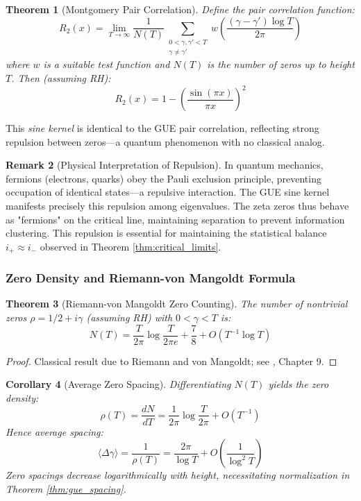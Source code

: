\documentclass[12pt]{article}
\theoremstyle{plain}
\newtheorem{theorem}{Theorem}[section]
\newtheorem{corollary}[theorem]{Corollary}
\theoremstyle{definition}
\newtheorem{remark}[theorem]{Remark}
\begin{document}
\begin{theorem}[Montgomery Pair Correlation]\label{thm:montgomery_correlation}
Define the pair correlation function:
$$R_2(x) = \lim_{T \to \infty} \frac{1}{N(T)} \sum_{\substack{0 < \gamma, \gamma' < T \\ \gamma \neq \gamma'}} w\left(\frac{(\gamma - \gamma') \log T}{2\pi}\right)$$
where $w$ is a suitable test function and $N(T)$ is the number of zeros up to height $T$. Then (assuming RH):
$$R_2(x) = 1 - \left(\frac{\sin(\pi x)}{\pi x}\right)^2$$
\end{theorem}

This \emph{sine kernel} is identical to the GUE pair correlation, reflecting strong repulsion between zeros—a quantum phenomenon with no classical analog.

\begin{remark}[Physical Interpretation of Repulsion]
In quantum mechanics, fermions (electrons, quarks) obey the Pauli exclusion principle, preventing occupation of identical states—a repulsive interaction. The GUE sine kernel manifests precisely this repulsion among eigenvalues. The zeta zeros thus behave as "fermions" on the critical line, maintaining separation to prevent information clustering. This repulsion is essential for maintaining the statistical balance $i_+ \approx i_-$ observed in Theorem \ref{thm:critical_limits}.
\end{remark}

\subsubsection{Zero Density and Riemann-von Mangoldt Formula}

\begin{theorem}[Riemann-von Mangoldt Zero Counting]\label{thm:zero_counting}
The number of nontrivial zeros $\rho = 1/2 + i\gamma$ (assuming RH) with $0 < \gamma < T$ is:
\begin{equation}
N(T) = \frac{T}{2\pi} \log \frac{T}{2\pi e} + \frac{7}{8} + O(T^{-1} \log T)
\end{equation}
\end{theorem}

\begin{proof}
Classical result due to Riemann and von Mangoldt; see \cite{titchmarsh1986}, Chapter 9.
\end{proof}

\begin{corollary}[Average Zero Spacing]
Differentiating $N(T)$ yields the zero density:
$$\rho(T) = \frac{dN}{dT} = \frac{1}{2\pi} \log \frac{T}{2\pi} + O(T^{-1})$$
Hence average spacing:
$$\langle \Delta \gamma \rangle = \frac{1}{\rho(T)} = \frac{2\pi}{\log T} + O\left(\frac{1}{\log^2 T}\right)$$
Zero spacings decrease logarithmically with height, necessitating normalization in Theorem \ref{thm:gue_spacing}.
\end{corollary}
\end{document}
